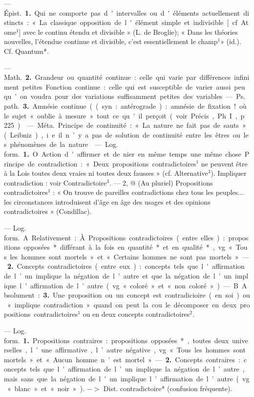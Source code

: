 \begin{itemize}[leftmargin=1cm, label=, itemsep=11pt]
 — \si{Épist.} {\bf 1.} Qui ne comporte
pas d'intervalles ou d'éléments
actuellement distincts : « La classique
opposition de l'élément simple
et indivisible [cf. Atome$^1$] avec le
continu étendu et divisible » (L. de
Broglie); « Dans les théories nouvelles, l'étendue continue et divisible, c'est essentiellement le champ$^1$»
(id.). Cf. Quantum*.

— \si{Math.}  {\bf 2.} Grandeur ou quantité
continue : celle qui varie par différences infiniment petites. Fonction
continue : celle qui est susceptible de
varier aussi peu qu’on voudra pour
des variations suffisamment petites
des variables.

— \si{Ps. path.}  {\bf 3.} Amnésie continue
((syn. : antérograde) : amnésie de
fixation! où le sujet « oublie à mesure » tout ce qu'il perçoit (voir
Précis, Ph. I, p. 225).

 — \si{Méta.} Principe de continuité : « La nature ne fait pas de
sauts » (Leibniz), i. e. il n’y a pas de
solution de continuité entre les êtres
ou les phénomènes de la nature.

 — \si{Log. form.} {\bf 1.} O
Action d'affirmer et de nier en même
temps une même chose. Principe de
contradiction : « Deux propositions
contradictoires$^1$ ne peuvent être à la
Lois toutes deux vraies ni toutes deux
fausses » (cf. Alternative$^3$). Impliquer contradiction : voir Contradictoire$^3$. — 2, @ (Au pluriel) Propositions contradictoires$^1$ : « On trouve
de pareilles contradictions chez
tous les peuples... les circonstances
introduisent d'âge en âge des usages
et des opinions contradictoires »
(Condillac).

 — \si{Log. form.} A. Relativement : À. Propositions contradictoires (entre elles) : propositions
opposées* différant à la fois en
quantité* et en qualité*, vg. « Tous
les hommes sont mortels » et « Certains hommes ne sont pas mortels ».

—  {\bf 2.} Concepts contradictoires (entre
eux) : concepts tels que l'affirmation
de l’un implique la négation de
l’autre et que la négation de l’un
implique l'affirmation de l’autre
(vg. « coloré » et « non coloré »). —
B. Absolument :  {\bf 3.} Une proposition
ou un concept est contradicioire (en
soi) ou « implique contradiction »
quand on peut la cou le décomposer
en deux propositions contradictoires$^1$ ou en deux concepts contradictoires$^2$.

 — \si{Log. form.} {\bf 1.} Propositions contraires : propositions opposées*, toutes deux universelles, l’une
affirmative, l’autre négative, vg.
« Tous les hommes sont mortels » et
« Aucun homme n’est mortel » —
 {\bf 2.} Concepts contraires : concepts tels
que l'affirmation de l’un implique
la négation de l’autre, mais sans que
la négation de l'un implique l’affirmation de l’autre (vg. « blanc » et
« noir »). $->$ Dist. contradictoire*
(confusion fréquente).


\end{itemize}
